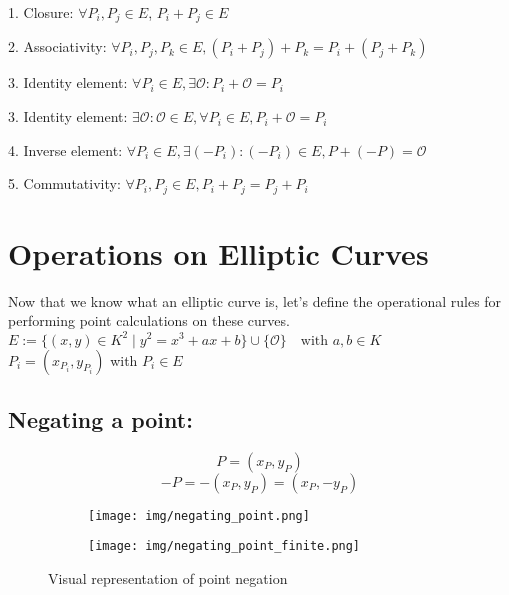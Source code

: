 \documentclass[bp,en]{FEIstyle}
\newcommand{\point}[1]{
#1 = (x_{#1}, y_{#1})
}
\begin{document}
1. Closure: $\forall P_i,P_j\in E$, $P_i + P_j\in E$

2. Associativity: $\forall P_i,P_j,P_k\in E, (P_i + P_j)+ P_k=P_i+ (P_j+ P_k)$

3. Identity element: $\forall P_i\in E,\exists \mathcal{O}: P_i+\mathcal{O}=P_i$

3. Identity element: $\exists \mathcal{O}:\mathcal{O} \in E, \forall P_i\in E, P_i+\mathcal{O}=P_i$


4. Inverse element: $\forall P_i\in E,\exists  (-P_i) : (-P_i) \in E, P+(-P)=\mathcal{O}$

5. Commutativity: $\forall P_i,P_j\in E, P_i+P_j=P_j+P_i$


\newpage
\section*{Operations on Elliptic Curves}
Now that we know what an elliptic curve is, let's define the operational rules for performing point calculations on these curves. \\
$E := \{ (x,y) \in K^2 \mid y^2 = x^3 + ax + b \} \cup \{ \mathcal{O} 
\} \quad \text{with } a, b \in K$ \\ 
$\point{P_i}$ with $P_i \in E$
\subsection*{Negating a point:}
\[ 
P = (x_P, y_P) 
\]
\[ 
-P = -(x_P, y_P) = (x_P, - y_P)
\]
\begin{figure}[H]
    \centering
    \begin{subfigure}{0.4\textwidth}
        \texttt{[image: img/negating\_point.png]}
        \label{fig:negating_point_curve_1}
    \end{subfigure}%
    \begin{subfigure}{0.4255\textwidth}
        \texttt{[image: img/negating\_point\_finite.png]}
        \label{fig:negating_point_curve_2}
    \end{subfigure}%
    \caption{Visual representation of point negation }
    \label{fig:negating_point_curves}
\end{figure}
\end{document}
